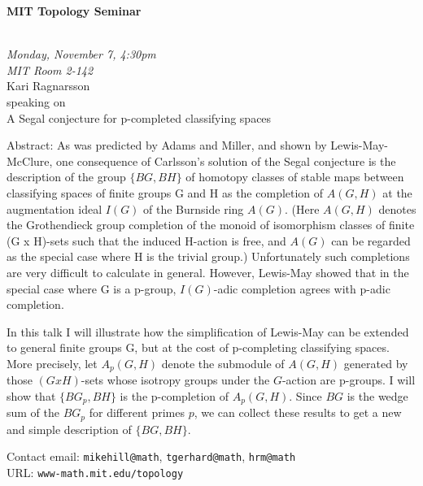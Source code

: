 \documentclass{slides}
\begin{document}
\begin{center}

{\fontsize {54pt}{40pt}\selectfont

\textrm{
{\textbf{MIT Topology Seminar}}}
}\\
\vspace{.5cm}
{\large\textrm{\emph{Monday, November 7, 4:30pm\\MIT Room 2-142}}}\\
\vspace{.5cm}
\textrm{{\LARGE Kari Ragnarsson}}  \\
\vspace{.5cm} %
\textrm{speaking on}\\ %
\vspace{5mm}
\textrm{{\LARGE A Segal conjecture for p-completed classifying spaces}}\\
\end{center}
\vspace{1cm}
{\tiny
Abstract: As was predicted by Adams and Miller, and shown by
Lewis-May-McClure, one consequence of Carlsson's solution of the Segal
conjecture is the description of the group $\{BG,BH\}$ of homotopy classes of
stable maps between classifying spaces of finite groups G and H as the
completion of $A(G,H)$ at the augmentation ideal $I(G)$ of the Burnside ring
$A(G)$. (Here $A(G,H)$ denotes the Grothendieck group completion of the monoid
of isomorphism classes of finite (G x H)-sets such that the induced
H-action is free, and $A(G)$ can be regarded as the special case where H is
the trivial group.) Unfortunately such completions are very difficult to
calculate in general. However, Lewis-May showed that in the special case
where G is a p-group, $I(G)$-adic completion agrees with p-adic completion.

In this talk I will illustrate how the simplification of Lewis-May can be
extended to general finite groups G, but at the cost of p-completing
classifying spaces. More precisely, let $A_p(G,H)$ denote the submodule of
$A(G,H)$ generated by those $(G x H)$-sets whose isotropy groups under the
$G$-action are p-groups. I will show that $\{BG^{}_p,BH\}$ is the p-completion of
$A_p(G,H)$. Since $BG$ is the wedge sum of the $BG^{}_p$ for different primes
$p$, we can collect these results to get a new and simple description of
$\{BG,BH\}$.

\textrm{Contact email: } \texttt{mikehill@math}, \texttt{tgerhard@math},
\texttt{hrm@math}\\
\textrm{URL: } \texttt{www-math.mit.edu/topology}
}
\end{document}
